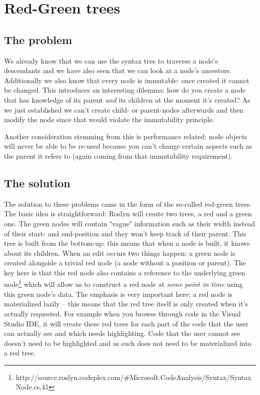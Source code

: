 \section{Red-Green trees}
\label{sec:red-green-trees}

\subsection{The problem}
\label{sec:rg-trees-problem}

We already know that we can use the syntax tree to traverse a node's descendants and we have also seen that we can look at a node's ancestors. Additionally we also know that every node is immutable: once created it cannot be changed. This introduces an interesting dilemma: how do you create a node that has knowledge of its parent \textit{and} its children at the moment it's created? As we just established we can't create child- or parent-nodes afterwards and then modify the node since that would violate the immutability principle.

Another consideration stemming from this is performance related: node objects will never be able to be re-used because you can't change certain aspects such as the parent it refers to (again coming from that immutability requirement).

\subsection{The solution}
\label{sec:rg-trees-solution}

The solution to these problems came in the form of the so-called red-green trees. The basic idea is straightforward: Roslyn will create two trees, a red and a green one. The green nodes will contain "vague" information such as their width instead of their start- and end-position and they won't keep track of their parent. This tree is built from the bottom-up: this means that when a node is built, it knows about its children.
When an edit occurs two things happen: a green node is created alongside a trivial red node (a node without a position or parent). The key here is that this red node also contains a reference to the underlying green node\footnote{http://source.roslyn.codeplex.com/\#Microsoft.CodeAnalysis/Syntax/SyntaxNode.cs,41} which will allow us to construct a red node at \textit{some point in time} using this green node's data.  
The emphasis is very important here: a red node is materialized lazily -- this means that the red tree itself is only created when it's actually requested. For example when you browse through code in the Visual Studio IDE, it will create these red trees for each part of the code that the user can actually see and which needs highlighting. Code that the user cannot see doesn't need to be highlighted and as such does not need to be materialized into a red tree.

